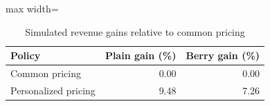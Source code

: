 \begin{table}[htbp]\centering\small
\caption{Simulated revenue gains relative to common pricing}
\label{tab:pricing-benchmarks}
\begin{adjustbox}{max width=\linewidth}
\begin{tabular}{lrr}\toprule
Policy & Plain gain (\%) & Berry gain (\%)\\\midrule
Common pricing & 0.00 & 0.00 \\
Personalized pricing & 9.48 & 7.26 \\
\bottomrule\end{tabular}
\end{adjustbox}
\end{table}
